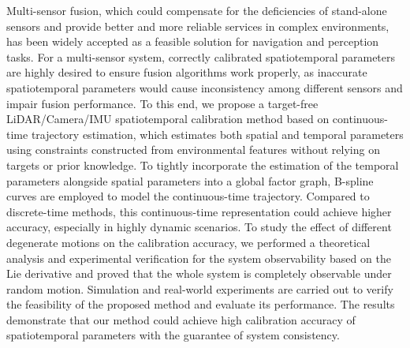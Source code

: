 
Multi-sensor fusion, which could compensate for the deficiencies of stand-alone sensors and provide better and more reliable services in complex environments, has been widely accepted as a feasible solution for navigation and perception tasks. For a multi-sensor system, correctly calibrated spatiotemporal parameters are highly desired to ensure fusion algorithms work properly, as inaccurate spatiotemporal parameters
would cause inconsistency among different sensors and impair
fusion performance. To this end, we propose a target-free LiDAR/Camera/IMU spatiotemporal calibration method based on continuous-time trajectory estimation, which estimates both spatial and temporal parameters using constraints constructed from environmental features without relying on targets or prior knowledge. To tightly incorporate the estimation of the temporal parameters alongside spatial parameters into a global factor graph, B-spline curves are employed to model the continuous-time trajectory. Compared to discrete-time methods, this continuous-time representation could achieve higher accuracy, especially in highly dynamic scenarios. To study the effect of different degenerate motions on the calibration accuracy, we performed a theoretical analysis and experimental verification for the system observability based on the Lie derivative and proved that the whole system is completely observable under random motion. Simulation and real-world experiments are carried out to verify the feasibility of the proposed method and evaluate its performance. The results demonstrate that our method could achieve high calibration accuracy of spatiotemporal parameters with the guarantee of system consistency.